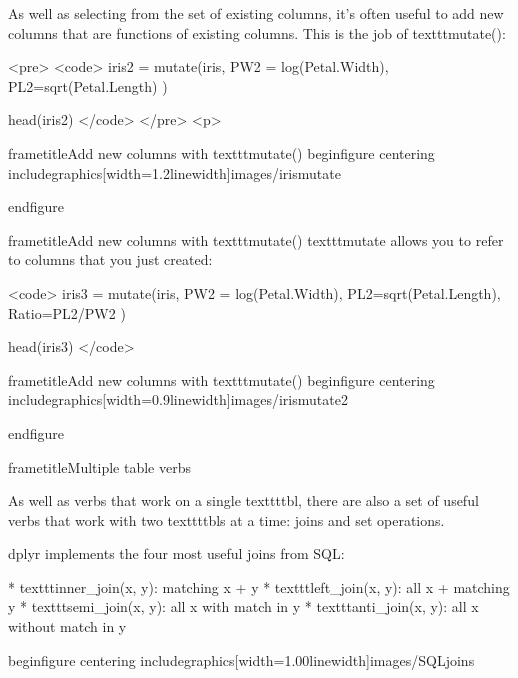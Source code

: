 		As well as selecting from the set of existing columns, it’s often useful to add new columns that are functions of existing columns. This is the job of texttt{mutate()}:
		
		<pre>
			<code>
			iris2 =  mutate(iris, 
			PW2 = log(Petal.Width), 
			PL2=sqrt(Petal.Length) )
			
			head(iris2)
			</code>
		</pre>
<p>
	
	
		
		frametitle{Add new columns with texttt{mutate()} }
		begin{figure}
			centering
			includegraphics[width=1.2linewidth]{images/irismutate}
			
		end{figure}
		
	
	
		
		frametitle{Add new columns with texttt{mutate()} }
		texttt{mutate} allows you to refer to columns that you just created:
		
		<code>
		iris3 =  mutate(iris, 
		PW2 = log(Petal.Width), 
		PL2=sqrt(Petal.Length), 
		Ratio=PL2/PW2 )
		
		head(iris3)
		</code>
	 
	
		
		frametitle{Add new columns with texttt{mutate()} }
		begin{figure}
			centering
			includegraphics[width=0.9linewidth]{images/irismutate2}
			
		end{figure}
		
	
	
	
	
		frametitle{Multiple table verbs}
		
		As well as verbs that work on a single texttt{tbl}, there are also a set of useful verbs that work with two texttt{tbl}s at a time: joins and set operations.
	
	
		
		dplyr implements the four most useful joins from SQL:
		
		
			         * texttt{inner_join(x, y)}: matching x + y
			         * texttt{left_join(x, y)}: all x + matching y
			         * texttt{semi_join(x, y)}: all x with match in y
			         * texttt{anti_join(x, y)}: all x without match in y
		
	
	
		begin{figure}
			centering
			includegraphics[width=1.00linewidth]{images/SQLjoins}
			

